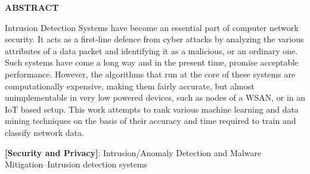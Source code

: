 \begin{center}
\Large{\textbf{ABSTRACT}}\\
\end{center}
Intrusion Detection Systems have become an essential part of computer network security. It acts as a first-line defence from cyber attacks by analyzing the various attributes of a data packet and identifying it as a malicious, or an ordinary one. Such systems have come a long way and in the present time, promise acceptable performance. However, the algorithms that run at the core of these systems are computationally expensive, making them fairly accurate, but almost unimplementable in very low powered devices, such as nodes of a WSAN, or in an IoT based setup. This work attempts to rank various machine learning and data mining techniques on the basis of their accuracy and time required to train and classify network data.

\par
\textbf{[Security and Privacy]}: Intrusion/Anomaly Detection and Malware Mitigation--Intrusion detection systems
